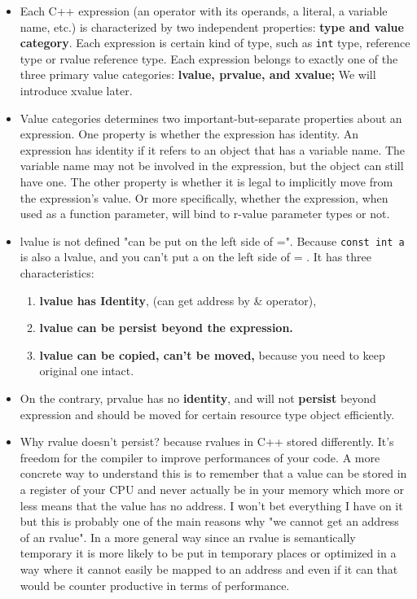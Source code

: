 \documentclass[a4paper,11pt,twoside]{book}
\begin{document}
\begin{itemize}

	\item Each C++ expression (an operator with its operands, a literal, a variable name, etc.) is characterized by two independent properties: \textbf{type and value category}. Each expression is certain kind of type, such as \texttt{int} type, reference type or rvalue reference type. Each expression belongs to exactly one of the three primary value categories: \textbf{lvalue, prvalue, and xvalue;} We will introduce xvalue later. 
			
    \item Value categories determines two important-but-separate properties about an expression. One property is whether the expression has identity. An expression has identity if it refers to an object that has a variable name. The variable name may not be involved in the expression, but the object can still have one. The other property is whether it is legal to implicitly move from the expression's value. Or more specifically, whether the expression, when used as a function parameter, will bind to r-value parameter types or not.

	\item lvalue is not defined "can be put on the left side of =". Because \texttt{const int a} is also a lvalue, and you can't put a on the left side of = . It has three characteristics:
\begin{enumerate}
	\item\textbf{lvalue has Identity}, (can get address by \& operator),
	\item \textbf{lvalue can be persist beyond the expression. }
	\item \textbf{lvalue can be copied, can't be moved,} because you need to keep original one intact.
\end{enumerate}

	\item On the contrary, prvalue has no \textbf{identity}, and will not \textbf{persist} beyond expression and should be moved for certain resource type object efficiently.

	\item Why rvalue doesn't persist? because rvalues in C++ stored differently. It's freedom for the compiler to improve performances of your code. A more concrete way to understand this is to remember that a value can be stored in a register of your CPU and never actually be in your memory which more or less means that the value has no address. I won't bet everything I have on it but this is probably one of the main reasons why "we cannot get an address of an rvalue". In a more general way since an rvalue is semantically temporary it is more likely to be put in temporary places or optimized in a way where it cannot easily be mapped to an address and even if it can that would be counter productive in terms of performance.


\end{itemize}
\end{document}

